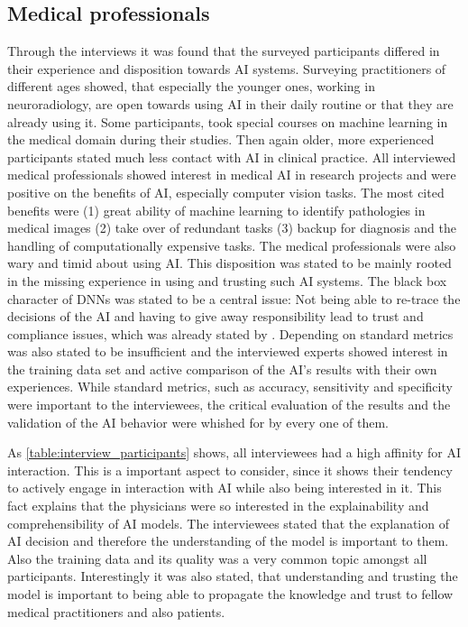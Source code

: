 \documentclass[11pt,a4paper,english]{scrreprt}
\begin{document}
\subsection{Medical professionals}
Through the interviews it was found that the surveyed participants differed in their experience and disposition towards AI systems. Surveying practitioners of different ages showed, that especially the younger ones, working in neuroradiology, are open towards using AI in their daily routine or that they are already using it. Some participants, took special courses on machine learning in the medical domain during their studies. Then again older, more experienced participants stated much less contact with AI in clinical practice. All interviewed medical professionals showed interest in medical AI in research projects and were positive on the benefits of AI, especially computer vision tasks. The most cited benefits were (1) great ability of machine learning to identify pathologies in medical images (2) take over of redundant tasks (3) backup for diagnosis and the handling of computationally expensive tasks. The medical professionals were also wary and timid about using AI. This disposition was stated to be mainly rooted in the missing experience in using and trusting such AI systems. The black box character of DNNs was stated to be a central issue: Not being able to re-trace the decisions of the AI and having to give away responsibility lead to trust and compliance issues, which was already stated by \textcite{ras_explainable_2021}. Depending on standard metrics was also stated to be insufficient and the interviewed experts showed interest in the training data set and active comparison of the AI's results with their own experiences. While standard metrics, such as accuracy, sensitivity and specificity were important to the interviewees, the critical evaluation of the results and the validation of the AI behavior were whished for by every one of them.

As \autoref{table:interview_participants} shows, all interviewees had a high affinity for AI interaction. This is a important aspect to consider, since it shows their tendency to actively engage in interaction with AI while also being interested in it. This fact explains that the physicians were so interested in the explainability and comprehensibility of AI models. The interviewees stated that the explanation of AI decision and therefore the understanding of the model is important to them. Also the training data and its quality was a very common topic amongst all participants. Interestingly it was also stated, that understanding and trusting the model is important to being able to propagate the knowledge and trust to fellow medical practitioners and also patients.
\end{document}
